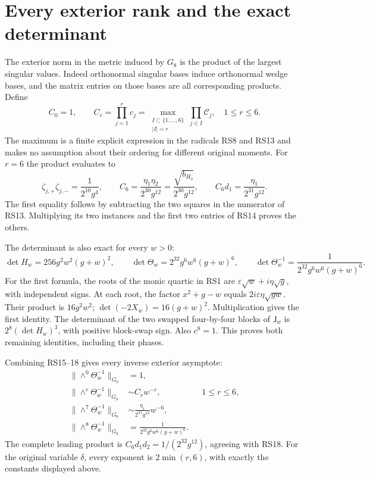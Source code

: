 \section{Every exterior rank and the exact determinant}
The exterior norm in the metric induced by $G_8$ is the product
of the largest singular values. Indeed orthonormal singular
bases induce orthonormal wedge bases, and the matrix entries
on those bases are all corresponding products. Define
\begin{equation}
 C_0=1,\qquad C_r=\prod_{j=1}^r c_j
 =\max_{\substack{I\subset\{1,\ldots,6\}\\|I|=r}}
                         \prod_{j\in I}\mathcal C_j,
 \quad1\le r\le6.
 \tag{RS16}
\end{equation}
The maximum is a finite explicit expression in the radicals
RS8 and RS13 and makes no assumption about their ordering for
different original moments. For $r=6$ the product evaluates to
\begin{equation}
 \zeta_{j,+}\zeta_{j,-}=\frac1{2^{10}g^4},\qquad
 C_6=\frac{\eta_1\eta_2}{2^{30}g^{12}}
     =\frac{\sqrt{b_{H_0}}}{2^{30}g^{12}},\qquad
 C_6d_1=\frac{\eta_1}{2^{31}g^{12}}.
 \tag{RS17}
\end{equation}
The first equality follows by subtracting the two squares in
the numerator of RS13. Multiplying its two instances and
the first two entries of RS14 proves the others.

The determinant is also exact for every $w>0$:
\begin{equation}
 \det H_w=256g^2w^2(g+w)^2,\qquad
 \det\Theta_w=2^{32}g^6w^6(g+w)^6,\qquad
 \det\Theta_w^{-1}=\frac1{2^{32}g^6w^6(g+w)^6}.
 \tag{RS18}
\end{equation}
For the first formula, the roots of the monic quartic in RS1
are $\varepsilon\sqrt w+i\eta\sqrt g$, with independent signs.
At each root, the factor $x^2+g-w$ equals
$2i\varepsilon\eta\sqrt{gw}$. Their product is $16g^2w^2$;
$\det(-2X_w)=16(g+w)^2$. Multiplication gives the first
identity. The determinant of the two swapped four-by-four
blocks of $\mathsf J_w$ is $2^8(\det H_w)^3$, with positive
block-swap sign. Also $c^8=1$. This proves both remaining
identities, including their phases.

Combining RS15--18 gives every inverse exterior asymptote:
\begin{equation}
 \boxed{\begin{aligned}
 \|\wedge^0\Theta_w^{-1}\|_{G_8}&=1,\\
 \|\wedge^r\Theta_w^{-1}\|_{G_8}&\sim C_rw^{-r},&&1\le r\le6,\\
 \|\wedge^7\Theta_w^{-1}\|_{G_8}&\sim
                       \frac{\eta_1}{2^{31}g^{12}}w^{-6},\\
 \|\wedge^8\Theta_w^{-1}\|_{G_8}&=
                       \frac1{2^{32}g^6w^6(g+w)^6}.
 \end{aligned}}
 \tag{RS19}
\end{equation}
The complete leading product is
$C_6d_1d_2=1/(2^{32}g^{12})$, agreeing with RS18.
For the original variable $\delta$, every exponent is
$2\min(r,6)$, with exactly the constants displayed above.

